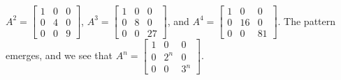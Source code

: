 $A^{2} = \begin{bmatrix} 1 & 0 & 0 \\ 0 & 4 & 0\\ 0 & 0 & 9\end{bmatrix}$, 
$A^{3} = \begin{bmatrix} 1 & 0 & 0 \\ 0 & 8 & 0\\ 0 & 0 & 27\end{bmatrix}$, and 
$A^{4} = \begin{bmatrix} 1 & 0 & 0 \\ 0 & 16 & 0\\ 0 & 0 & 81\end{bmatrix}$.  
The pattern emerges, and we see that 
$A^{n} = \begin{bmatrix} 1 & 0 & 0 \\ 0 & 2^n & 0\\ 0 & 0 & 3^n\end{bmatrix}$.